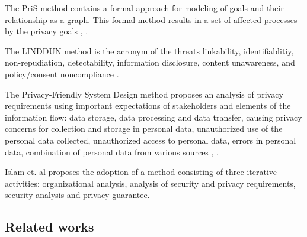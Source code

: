 \documentclass[conference]{IEEEtran}
\begin{document}
The PriS method contains a formal approach for modeling of goals and their relationship as a graph. This formal method results in a set of affected processes by the privacy goals \cite{DBLP:journals/re/KalloniatisKG08}, \cite{DBLP:conf/IEEEares/Beckers12}.

The LINDDUN method is the acronym of the threats linkability, identifiablitiy, non-repudiation, detectability, information disclosure, content unawareness, and policy/consent noncompliance \cite{DBLP:conf/IEEEares/Beckers12}.


The Privacy-Friendly System Design method proposes an analysis of privacy requirements using important expectations of stakeholders and elements of the information flow: data storage, data processing and data transfer, causing privacy concerns for collection and storage in personal data, unauthorized use of the personal data collected, unauthorized access to personal data, errors in personal data, combination of personal data from various sources \cite{DBLP:journals/tse/SpiekermannC09}, \cite{DBLP:journals/access/CaizaMGAY19}.


Islam et. al \cite{DBLP:journals/tcc/IslamOKMG18} proposes the adoption of a method consisting of three iterative activities: organizational analysis, analysis of security and privacy requirements, security analysis and privacy guarantee.

\subsection{Related works}

\end{document}

